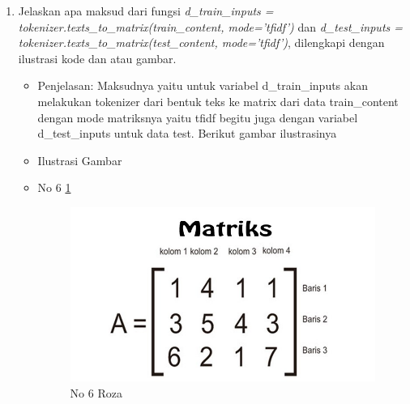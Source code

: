 \begin{enumerate}
\item Jelaskan apa maksud dari fungsi \emph{d\_train\_inputs = tokenizer.texts\_to\_matrix(train\_content, mode='tfidf')} dan \emph{d\_test\_inputs = tokenizer.texts\_to\_matrix(test\_content, mode='tfidf')}, dilengkapi dengan ilustrasi kode dan atau gambar.
\begin{itemize}
\item Penjelasan: Maksudnya yaitu untuk variabel d\_train\_inputs akan melakukan tokenizer dari bentuk teks ke matrix dari data train\_content dengan mode matriksnya yaitu tfidf begitu juga dengan variabel d\_test\_inputs untuk data test. Berikut gambar ilustrasinya
\par 
\par
\item Ilustrasi Gambar
\item No 6 \ref{teori6}
\begin{figure}[!hbtp]
\centering
\includegraphics[scale=0.3]{figures/teori6.jpg}
\caption{No 6 Roza}
\label{teori6}
\end{figure}
\par
\end{itemize}
\par
\par


\end{enumerate}
